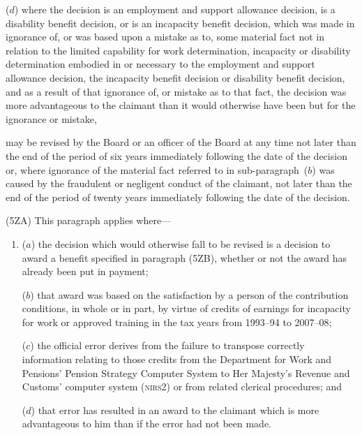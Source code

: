 \documentclass[12pt,a4paper]{article}
\begin{document}
\begin{enumerate}
($d$) where the decision 
is an employment and support allowance decision,  %
is a disability benefit decision, or is an incapacity benefit decision, which was made in ignorance of, or was based upon a mistake as to, some material fact not in relation to the 
limited capability for work determination,  %
incapacity or disability determination embodied in or necessary to 
the employment and support allowance decision,  %
the incapacity benefit decision or disability benefit decision, and as a result of that ignorance of, or mistake as to that fact, the decision was more advantageous to the claimant than it would otherwise have been but for the ignorance or mistake,
\end{enumerate}
may be revised 
by the Board or an officer of the Board at any time not later than the end of the period of six years immediately following the date of the decision or, where ignorance of the material fact referred to in sub-paragraph~($b$)  was caused by the fraudulent or negligent conduct of the claimant, not later than the end of the period of twenty years immediately following the date of the decision.  %

(5ZA) This paragraph applies where—
\begin{enumerate}\item[]
($a$) the decision which would otherwise fall to be revised is a decision to award a benefit specified in paragraph (5ZB), whether or not the award has already been put in payment;

($b$) that award was based on the satisfaction by a person of the contribution conditions, in whole or in part, by virtue of credits of earnings for incapacity for work or approved training in the tax years from 1993--94 to 2007--08;

($c$) the official error derives from the failure to transpose correctly information relating to those credits from the Department for Work and Pensions’ Pension Strategy Computer System to Her Majesty’s Revenue and Customs’ computer system (\textsc{\lowercase{NIRS2}}) or from related clerical procedures; and

($d$) that error has resulted in an award to the claimant which is more advantageous to him than if the error had not been made.
\end{enumerate}
\end{document}
